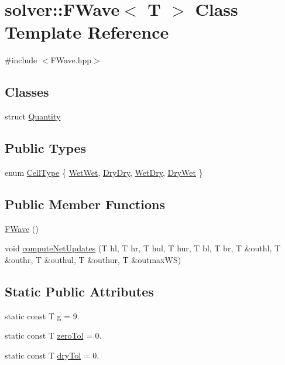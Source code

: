 \hypertarget{classsolver_1_1FWave}{}\section{solver\+:\+:F\+Wave$<$ T $>$ Class Template Reference}
\label{classsolver_1_1FWave}


{\ttfamily \#include $<$F\+Wave.\+hpp$>$}

\subsection*{Classes}
\begin{DoxyCompactItemize}
\item 
struct \hyperlink{structsolver_1_1FWave_1_1Quantity}{Quantity}
\end{DoxyCompactItemize}
\subsection*{Public Types}
\begin{DoxyCompactItemize}
\item 
enum \hyperlink{classsolver_1_1FWave_a311594734127c119adecdc164293b705}{Cell\+Type} \{ \hyperlink{classsolver_1_1FWave_a311594734127c119adecdc164293b705a06547946a0e672670e8462b6ba2dea09}{Wet\+Wet}, 
\hyperlink{classsolver_1_1FWave_a311594734127c119adecdc164293b705a5801fb68072c39ed9cabdf7e8fe3aec9}{Dry\+Dry}, 
\hyperlink{classsolver_1_1FWave_a311594734127c119adecdc164293b705a87b36bf7ab4331cb5246dccc030afa77}{Wet\+Dry}, 
\hyperlink{classsolver_1_1FWave_a311594734127c119adecdc164293b705a94f242a5ccfed3c65930b2d4bd7781dc}{Dry\+Wet}
 \}
\end{DoxyCompactItemize}
\subsection*{Public Member Functions}
\begin{DoxyCompactItemize}
\item 
\hyperlink{classsolver_1_1FWave_a446e2721d799afa5612a3a2b8c30d668}{F\+Wave} ()
\item 
void \hyperlink{classsolver_1_1FWave_adfb0c6a6e5e0de65210e3f4b137582ee}{compute\+Net\+Updates} (T hl, T hr, T hul, T hur, T bl, T br, T \&outhl, T \&outhr, T \&outhul, T \&outhur, T \&outmax\+W\+S)
\end{DoxyCompactItemize}
\subsection*{Static Public Attributes}
\begin{DoxyCompactItemize}
\item 
static const T \hyperlink{classsolver_1_1FWave_ac3884c16c1822530961884e9f52304a2}{g} = 9.
\item 
static const T \hyperlink{classsolver_1_1FWave_aa7adb43b1b39a0f78d0784e05f7b040e}{zero\+Tol} = 0.
\item 
static const T \hyperlink{classsolver_1_1FWave_a81a9f987fa6f23ec96c557615cee17f5}{dry\+Tol} = 0.
\end{DoxyCompactItemize}
